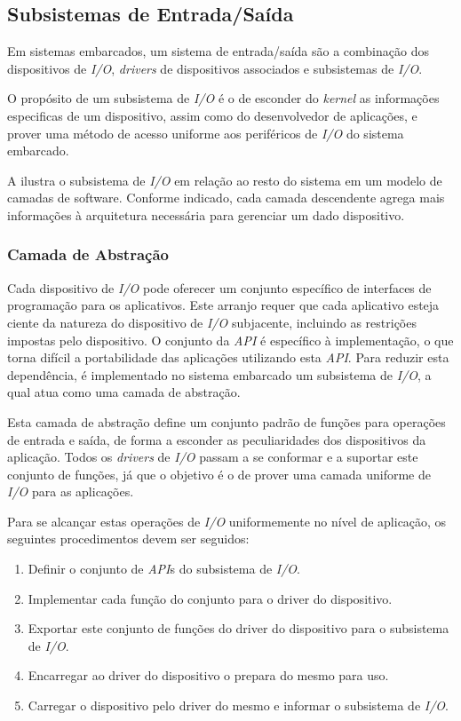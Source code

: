\subsection{Subsistemas de Entrada/Saída}

Em sistemas embarcados, um sistema de entrada/saída são a combinação dos dispositivos de \emph{I/O}, \emph{drivers} de dispositivos associados e subsistemas de \emph{I/O}.

O propósito de um subsistema de \emph{I/O} é o de esconder do \emph{kernel} as informações especificas de um dispositivo, assim como do desenvolvedor de aplicações, e prover uma método de acesso uniforme aos periféricos de \emph{I/O} do sistema embarcado.

A  ilustra o subsistema de \emph{I/O} em relação ao resto do sistema em um modelo de camadas de software. Conforme indicado, cada camada descendente agrega mais informações à arquitetura necessária para gerenciar um dado dispositivo.


\subsubsection{Camada de Abstração}

Cada dispositivo de \emph{I/O} pode oferecer um conjunto específico de interfaces de programação para os aplicativos. Este arranjo requer que cada aplicativo esteja ciente da natureza do dispositivo de \emph{I/O} subjacente, incluindo as restrições impostas pelo dispositivo. O conjunto da \emph{API} é específico à implementação, o que torna difícil a portabilidade das aplicações utilizando esta \emph{API}. Para reduzir esta dependência, é implementado no sistema embarcado um subsistema de \emph{I/O}, a qual atua como uma camada de abstração.

Esta camada de abstração define um conjunto padrão de funções para operações de entrada e saída, de forma a esconder as peculiaridades dos dispositivos da aplicação. Todos os \emph{drivers} de \emph{I/O} passam a se conformar e a suportar este conjunto de funções, já que o objetivo é o de prover uma camada uniforme de \emph{I/O} para as aplicações. 

Para se alcançar estas operações de \emph{I/O} uniformemente no nível de aplicação, os seguintes procedimentos devem ser seguidos:

\begin{enumerate}
	\item Definir o conjunto de \emph{API}s do subsistema de \emph{I/O}.
	\item Implementar cada função do conjunto para o driver do dispositivo.
	\item Exportar este conjunto de funções do driver do dispositivo para o subsistema de \emph{I/O}.
	\item Encarregar ao driver do dispositivo o prepara do mesmo para uso.
	\item Carregar o dispositivo pelo driver do mesmo e informar o subsistema de \emph{I/O}.
\end{enumerate}

